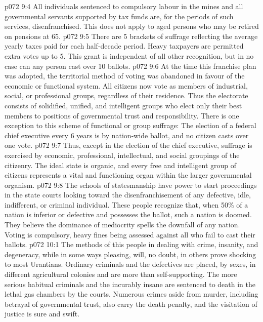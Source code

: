 \vs p072 9:4 \bibnobreakspace All individuals sentenced to compulsory labour in the mines and all governmental servants supported by tax funds are, for the periods of such services, disenfranchised. This does not apply to aged persons who may be retired on pensions at 65.
\vs p072 9:5 \bibnobreakspace There are 5 brackets of suffrage reflecting the average yearly taxes paid for each half\hyp{}decade period. Heavy taxpayers are permitted extra votes up to 5. This grant is independent of all other recognition, but in no case can any person cast over 10 ballots.
\vs p072 9:6 \bibnobreakspace At the time this franchise plan was adopted, the territorial method of voting was abandoned in favour of the economic or functional system. All citizens now vote as members of industrial, social, or professional groups, regardless of their residence. Thus the electorate consists of solidified, unified, and intelligent groups who elect only their best members to positions of governmental trust and responsibility. There is one exception to this scheme of functional or group suffrage: The election of a federal chief executive every 6 years is by nation\hyp{}wide ballot, and no citizen casts over one vote.
\vs p072 9:7 \pc Thus, except in the election of the chief executive, suffrage is exercised by economic, professional, intellectual, and social groupings of the citizenry. The ideal state is organic, and every free and intelligent group of citizens represents a vital and functioning organ within the larger governmental organism.
\vs p072 9:8 The schools of statesmanship have power to start proceedings in the state courts looking toward the disenfranchisement of any defective, idle, indifferent, or criminal individual. These people recognize that, when 50\% of a nation is inferior or defective and possesses the ballot, such a nation is doomed. They believe the dominance of mediocrity spells the downfall of any nation. Voting is compulsory, heavy fines being assessed against all who fail to cast their ballots.
\vs p072 10:1 The methods of this people in dealing with crime, insanity, and degeneracy, while in some ways pleasing, will, no doubt, in others prove shocking to most Urantians. Ordinary criminals and the defectives are placed, by sexes, in different agricultural colonies and are more than self\hyp{}supporting. The more serious habitual criminals and the incurably insane are sentenced to death in the lethal gas chambers by the courts. Numerous crimes aside from murder, including betrayal of governmental trust, also carry the death penalty, and the visitation of justice is sure and swift.
